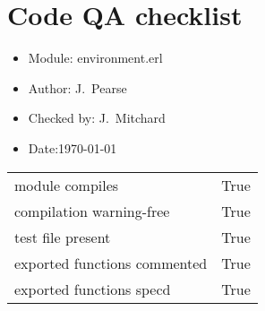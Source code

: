 \pagestyle{empty}

\section*{Code QA checklist}
\Large
\begin{itemize}
\item Module: environment.erl
\item Author: J.~Pearse
\item Checked by: J.~Mitchard
\item Date:\today
\end{itemize}
\Large
\begin{tabularx}{\textwidth}{ X | X }
module compiles & True\\
compilation warning-free & True\\
test file present & True\\
exported functions commented & True\\
exported functions specd & True\\
\end{tabularx}
\clearpage
\endinput
